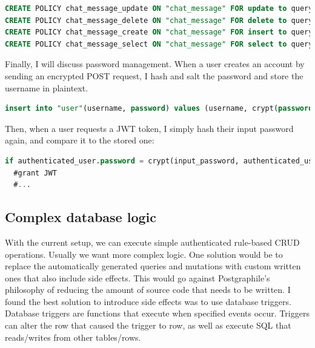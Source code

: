 \documentclass{l4proj}
\begin{document}
\begin{lstlisting}[language=SQL, caption={Row level security policies for accessing chat messages}, ]
CREATE POLICY chat_message_update ON "chat_message" FOR update to query_sender USING (username = (select username from active_user()));
CREATE POLICY chat_message_delete ON "chat_message" FOR delete to query_sender USING (username = (select username from active_user()));
CREATE POLICY chat_message_create ON "chat_message" FOR insert to query_sender with check (username = (select username from active_user()) and groupName = (select groupName from active_user()));
CREATE POLICY chat_message_select ON "chat_message" FOR select to query_sender using (groupName = (select groupName from active_user()));
\end{lstlisting}


Finally, I will discuss password management. When a user creates an account by sending an encrypted POST request, I hash and salt the password and store the username in plaintext.

\begin{lstlisting}[language=SQL, caption={Hashing and salting done with pgcrypto}]
insert into "user"(username, password) values (username, crypt(password, gen_salt('bf')));
\end{lstlisting}

Then, when a user requests a JWT token, I simply hash their input password again, and compare it to the stored one:
\begin{lstlisting}[language=SQL, caption={Hashing and salting done with pgcrypto}]
if authenticated_user.password = crypt(input_password, authenticated_user.password) then
  #grant JWT
  #...
\end{lstlisting}

\subsection{Complex database logic}
With the current setup, we can execute simple authenticated rule-based CRUD operations. Usually we want more complex logic. One solution would be to replace the automatically generated queries and mutations with custom written ones that also include side effects. This would go against Postgraphile's philosophy of reducing the amount of source code that needs to be written. I found the best solution to introduce side effects was to use database triggers. Database triggers are functions that execute when specified events occur. Triggers can alter the row that caused the trigger to row, as well as execute SQL that reads/writes from other tables/rows. 
\end{document}
